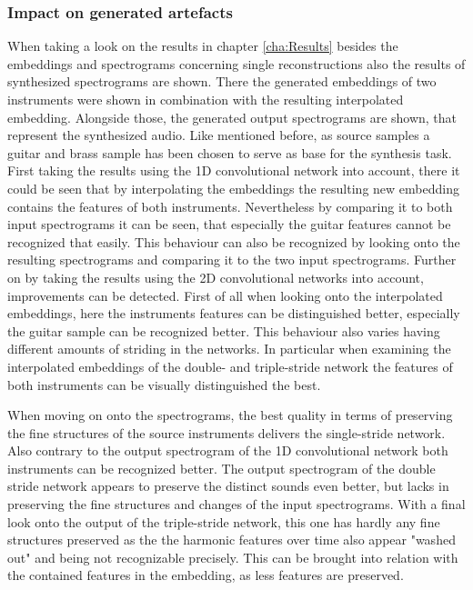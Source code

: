 \subsubsection{Impact on generated artefacts}
When taking a look on the results in chapter \ref{cha:Results} besides the embeddings and spectrograms concerning single reconstructions also the results of synthesized spectrograms are shown. There the generated embeddings of two instruments were shown in combination with the resulting interpolated embedding. Alongside those, the generated output spectrograms are shown, that represent the synthesized audio. Like mentioned before, as source samples a guitar and brass sample has been chosen to serve as base for the synthesis task. First taking the results using the 1D convolutional network into account, there it could be seen that by interpolating the embeddings the resulting new embedding contains the features of both instruments. Nevertheless by comparing it to both input spectrograms it can be seen, that especially the guitar features cannot be recognized that easily. This behaviour can also be recognized by looking onto the resulting spectrograms and comparing it to the two input spectrograms. Further on by taking the results using the 2D convolutional networks into account, improvements can be detected. First of all when looking onto the interpolated embeddings, here the instruments features can be distinguished better, especially the guitar sample can be recognized better. This behaviour also varies having different amounts of striding in the networks. In particular when examining the interpolated embeddings of the double- and triple-stride network the features of both instruments can be visually distinguished the best. 

When moving on onto the spectrograms, the best quality in terms of preserving the fine structures of the source instruments delivers the single-stride network. Also contrary to the output spectrogram of the 1D convolutional network both instruments can be recognized better. The output spectrogram of the double stride network appears to preserve the distinct sounds even better, but lacks in preserving the fine structures and changes of the input spectrograms. With a final look onto the output of the triple-stride network, this one has hardly any fine structures preserved as the the harmonic features over time also appear "washed out" and being not recognizable precisely. This can be brought into relation with the contained features in the embedding, as less features are preserved.

